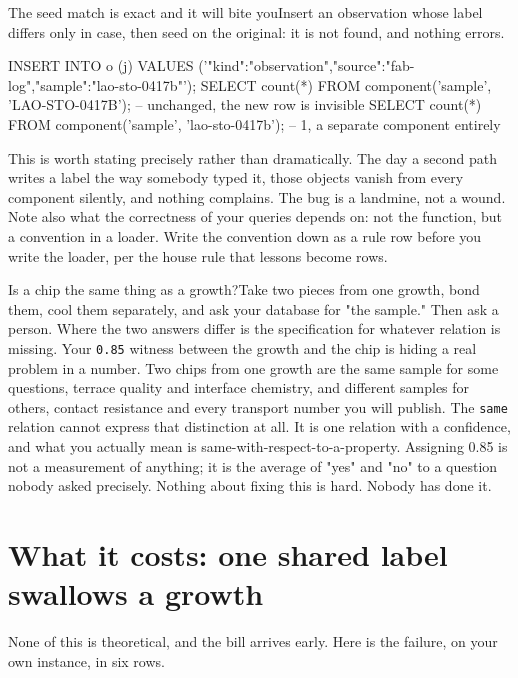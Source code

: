 \begin{Correspondence}{The seed match is exact and it will bite you}{Insert an observation whose label differs only in case, then seed on the original: it is not found, and nothing errors.}
\begin{Check}
INSERT INTO o (j) VALUES
  ('{"kind":"observation","source":"fab-log","sample":"lao-sto-0417b"}');
SELECT count(*) FROM component('sample', 'LAO-STO-0417B');   -- unchanged, the new row is invisible
SELECT count(*) FROM component('sample', 'lao-sto-0417b');   -- 1, a separate component entirely
\end{Check}
This is worth stating precisely rather than dramatically. The day a second path writes a label the way somebody typed it, those objects vanish from every component silently, and nothing complains. The bug is a landmine, not a wound. Note also what the correctness of your queries depends on: not the function, but a convention in a loader. Write the convention down as a rule row before you write the loader, per the house rule that lessons become rows.
\end{Correspondence}

\begin{Open}{Is a chip the same thing as a growth?}{Take two pieces from one growth, bond them, cool them separately, and ask your database for "the sample." Then ask a person. Where the two answers differ is the specification for whatever relation is missing.}
Your \texttt{0.85} witness between the growth and the chip is hiding a real problem in a number. Two chips from one growth are the same sample for some questions, terrace quality and interface chemistry, and different samples for others, contact resistance and every transport number you will publish. The \texttt{same} relation cannot express that distinction at all. It is one relation with a confidence, and what you actually mean is same-with-respect-to-a-property. Assigning 0.85 is not a measurement of anything; it is the average of "yes" and "no" to a question nobody asked precisely. Nothing about fixing this is hard. Nobody has done it.
\end{Open}

\section{What it costs: one shared label swallows a growth}

None of this is theoretical, and the bill arrives early. Here is the failure, on your own instance, in six rows.

